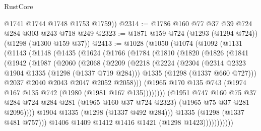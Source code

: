 \begin{lexlean}{RustCore}
\begin{coremodule}
        @1741
        @1744
        @1748
        @1753
        @1759))
@2314 := @1786 @160 @77 @37 @39 @724 @284 @303 @243 @718 @249
@2323 := @1871 @159 @724 (@1293 (@1294 @724)) (@1298 (@1300 @159 @37))
@2413 := @1028
    (@1050
      (@1074
        (@1092
          (@1131
            (@1143
              (@1148
                (@1435
                  (@1624
                    (@1766
                      (@1784
                        (@1810
                          (@1820
                            (@1826
                              (@1841
                                (@1942
                                  (@1987
                                    (@2060
                                      (@2068
                                        (@2209
                                          (@2218
                                            (@2224
                                              (@2304
                                                (@2314 @2323 @1904 @1335 (@1298 (@1337 @719 @284)))
                                                @1335
                                                (@1298 (@1337 @660 @727)))
                                              @2037
                                              @2040
                                              @2043
                                              @2047
                                              @2052
                                              @2058)))
                                        (@1965
                                          @170
                                          @135
                                          @743
                                          (@1974 @167 @135 @742 (@1980 (@1981 @167 @135))))))))
                                (@1951
                                  @747
                                  @160
                                  @75
                                  @37
                                  @284
                                  @724
                                  @284
                                  @281
                                  (@1965 @160 @37 @724 @2323)
                                  (@1965 @75 @37 @281 @2096))))
                            @1904
                            @1335
                            (@1298 (@1337 @492 @284)))
                          @1335
                          (@1298 (@1337 @481 @757)))
                        @1406
                        @1409
                        @1412
                        @1416
                        @1421
                        (@1298 @1423)))))))))))

\end{coremodule}
\end{lexlean}
